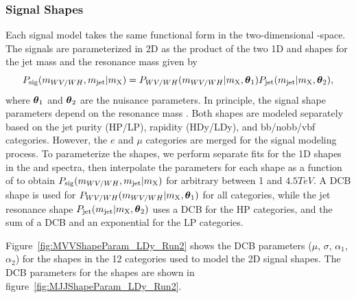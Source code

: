 \subsubsection{Signal Shapes}

Each signal model takes the same functional form in the two-dimensional \MJ-\MVV space.
The signals are parameterized in 2D as the product of the two 1D \MJ and \MVV shapes for the jet mass and the resonance mass given by
\begin{equation}
  P_\mathrm{sig}(m_{WV/WH},m_\mathrm{jet}|m_\mathrm{X})=P_{WV/WH}(m_{WV/WH}|m_\mathrm{X},\vb*{\theta}_1)P_\mathrm{jet}(m_\mathrm{jet}|m_\mathrm{X},\vb*{\theta}_2),
\end{equation}
where $\vb*{\theta}_1$ and $\vb*{\theta}_2$ are the nuisance parameters.
In principle, the signal shape parameters depend on the resonance mass \MX.
Both shapes are modeled separately based on the jet purity (HP/LP), rapidity (HDy/LDy), and bb/nobb/vbf categories.
However, the $e$ and $\mu$ categories are merged for the signal modeling process.
To parameterize the shapes, we perform separate fits for the 1D shapes in the \MVV and \MJ spectra, then interpolate the parameters for each shape as a function of \MX to obtain $P_\mathrm{sig}(m_{WV/WH},m_\mathrm{jet}|m_\mathrm{X})$ for arbitrary \MX between 1 and $4.5\unit{TeV}$.
A DCB shape is used for $P_{WV/WH}(m_{WV/WH}|m_\mathrm{X},\vb*{\theta}_1)$ for all categories, while the jet resonance shape $P_\mathrm{jet}(m_\mathrm{jet}|m_\mathrm{X},\vb*{\theta}_2)$ uses a DCB for the HP categories, and the sum of a DCB and an exponential for the LP categories.

Figure~\ref{fig:MVVShapeParam_LDy_Run2} shows the DCB parameters ($\mu$, $\sigma$, $\alpha_1$, $\alpha_2$) for the \MVV shapes in the 12 categories used to model the 2D signal shapes.
The DCB parameters for the \MJ shapes are shown in figure~\ref{fig:MJJShapeParam_LDy_Run2}.


